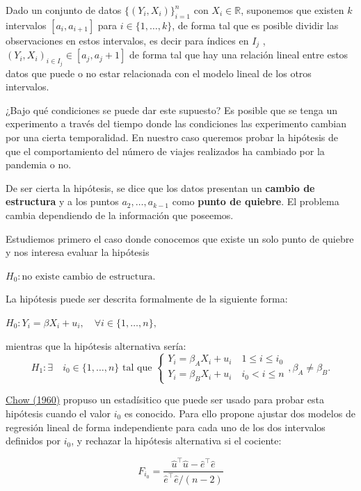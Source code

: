 \documentclass[
]{article}
\begin{document}
Dado un conjunto de datos \(\{(Y_i, X_i)\}_{i=1}^n\) con \(X_i \in \mathbb{R}\),
suponemos que existen \(k\) intervalos \([a_i, a_{i+1}]\) para
\(i \in \{1, \dots, k\}\), de forma tal que es posible dividir las
observaciones en estos intervalos, es decir para índices en \(I_j\) ,
\((Y_i, X_i)_{i \in I_j} \in [a_j, a_j+1]\) de forma tal que hay una
relación lineal entre estos datos que puede o no estar relacionada con
el modelo lineal de los otros intervalos.

¿Bajo qué condiciones se puede dar este supuesto? Es posible que se
tenga un experimento a través del tiempo donde las condiciones las
experimento cambian por una cierta temporalidad. En nuestro caso
queremos probar la hipótesis de que el comportamiento del número de
viajes realizados ha cambiado por la pandemia o no.

De ser cierta la hipótesis, se dice que los datos presentan un
\textbf{cambio de estructura} y a los puntos \(a_2, \dots, a_{k-1}\)
como \textbf{punto de quiebre}. El problema cambia dependiendo de la
información que poseemos.

Estudiemos primero el caso donde conocemos que existe un solo punto de
quiebre y nos interesa evaluar la hipótesis

\(H_0: \text{no existe cambio de estructura.}\)

La hipótesis puede ser descrita formalmente de la siguiente forma:

\(H_0: Y_i = \beta X_i + u_i, \quad \forall i\in\{1, \dots, n\},\)

mientras que la hipótesis alternativa sería:
\begin{equation*}
   H_1: \exists \quad i_0 \in \{1, \dots, n\} \text{ tal que }
   \begin{cases}
      Y_i = \beta_A X_i + u_i \quad 1 \leq i \leq i_0\\
      Y_i = \beta_B X_i + u_i \quad i_0 < i \leq n
   \end{cases},\beta_A \neq \beta_B.
\end{equation*}

\href{https://www.jstor.org/stable/1910133}{Chow (1960)} propuso un
estadísitico que puede ser usado para probar esta hipótesis cuando el
valor \(i_0\) es conocido. Para ello propone ajustar dos modelos de
regresión lineal de forma independiente para cada uno de los dos
intervalos definidos por \(i_0\), y rechazar la hipótesis alternativa si
el cociente:

\[F_{i_0} = \frac{\hat u^\top \hat u - \hat e ^\top \hat e}{\hat e^\top \hat e / (n - 2)}\]
\end{document}

